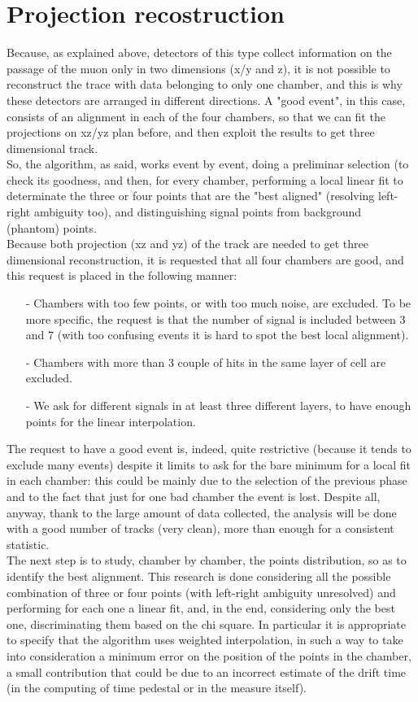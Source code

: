 \documentclass[a4paper,11pt]{book}
\begin{document}
\section{Projection recostruction}

Because, as explained above, detectors of this type collect information on the passage of the muon only in two dimensions (x/y and z), it is not possible to reconstruct the trace with data belonging to only one chamber, and this is why these detectors are arranged in different directions. A "good event", in this case, consists of an alignment in each of the four chambers, so that we can fit the projections on xz/yz plan before, and then exploit the results to get three dimensional track.\\ 
So, the algorithm, as said, works event by event, doing a preliminar selection (to check its goodness, and then, for every chamber,  performing a local linear fit to determinate the three or four points that are the "best aligned" (resolving left-right ambiguity too), and distinguishing signal points from background (phantom) points.\\
Because both projection (xz and yz) of the track are needed to get three dimensional reconstruction, it is requested that all four chambers are good, and this request is placed in the following manner:
\begin{itemize}
\item[-] Chambers with too few points, or with too much noise, are excluded. To be more specific, the request is that the number of signal is included between 3 and 7 (with too confusing events it is hard to spot the best local alignment).
\item[-] Chambers with more than 3 couple of hits in the same layer of cell are excluded.
\item[-] We ask for different signals in at least three different layers, to have enough points for the linear interpolation.
\end{itemize}
The request to have a good event is, indeed, quite restrictive (because it tends to exclude many events) despite it limits to ask for the bare minimum for a local fit in each chamber: this could be mainly due to the selection of the previous phase and to the fact that just for one bad chamber the event is lost. Despite all, anyway, thank to the large amount of data collected, the analysis will be done with a good number of tracks (very clean), more than enough for a consistent statistic.\\
The next step is to study, chamber by chamber, the points distribution, so as to identify the best alignment. This research is done considering all the possible combination of three or four points (with left-right ambiguity unresolved) and performing for each one a linear fit, and, in the end, considering only the best one, discriminating them based on the chi square. In particular it is appropriate to specify that the algorithm uses weighted interpolation, in such a way to take into consideration a minimum error on the position of the points in the chamber, a small contribution that could be due to an incorrect estimate of the drift time (in the computing of time pedestal or in the measure itself).\\
\end{document}
